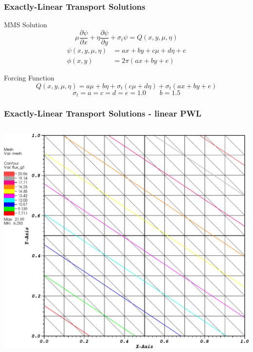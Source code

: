 \documentclass[compress,10pt]{beamer}
\begin{document}
\begin{frame}[t]
{
\frametitle{Exactly-Linear Transport Solutions}
\begin{block}{MMS Solution}
\begin{equation*}
\mu \frac{\partial \psi}{\partial x} + \eta \frac{\partial \psi}{\partial y} + \sigma_t \psi = Q(x,y, \mu, \eta)
\end{equation*}
\vspace{5mm}
\begin{equation*}
\begin{aligned}
\psi (x,y,\mu,\eta) &= ax + by + c \mu + d\eta + e\\
\phi (x,y) &= 2 \pi \left( ax + by  + e \right)
\end{aligned} 
\end{equation*}
\end{block}
\begin{block}{Forcing Function}
\begin{equation*}
Q(x,y,\mu,\eta) = a \mu + b \eta + \sigma_t \left(  c \mu + d \eta \right) + \sigma_t \left( ax +by + e   \right)
\end{equation*}
\vspace{3mm}
\begin{equation*}
\sigma_t = a = c = d = e = 1.0 \qquad b=1.5
\end{equation*}
\end{block}
}
{
\frametitle{Exactly-Linear Transport Solutions - linear PWL}
\centering
\begin{columns}
\centering
{}\includegraphics[width=0.95\columnwidth]{images/tri_MAXENT_k1.eps} \\

\end{columns}}
\end{frame}
\end{document}
